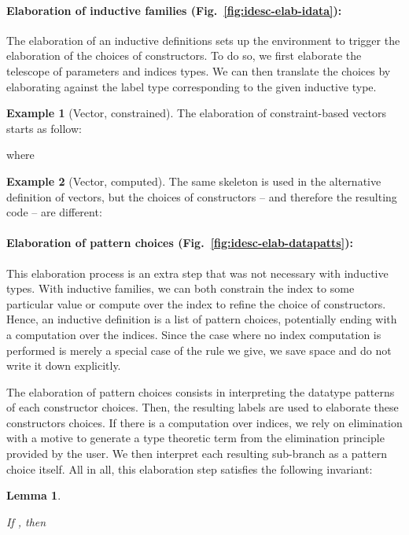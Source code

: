 \documentclass{scrartcl}
\theoremstyle{plain}
\newtheorem{lemma}{Lemma}
\theoremstyle{definition}
\newtheorem{example}{Example}
\begin{document}
\newcommand{\choicesVecEq}{\mathrm{choices}_{=}}
\newcommand{\codeVecEq}{\mathrm{code}_{=}}

\paragraph{Elaboration of inductive families (Fig.~\ref{fig:idesc-elab-idata}):} 
The elaboration of an inductive definitions sets up the environment to
trigger the elaboration of the choices of constructors. To do so, we
first elaborate the telescope of parameters and indices types. We can
then translate the choices by elaborating against the label type
corresponding to the given inductive type.

\begin{example}[Vector, constrained]
The elaboration of constraint-based vectors starts as follow:

where


\end{example}

\newcommand{\choicesVecComp}{\mathrm{choices}_{\to}}
\newcommand{\codeVecComp}{\mathrm{code}_{\to}}

\begin{example}[Vector, computed]

The same skeleton is used in the alternative definition of vectors,
but the choices of constructors -- and therefore the resulting code --
are different:
{\small

}

\end{example}



\paragraph{Elaboration of pattern choices (Fig.~\ref{fig:idesc-elab-datapatts}):}
This elaboration process is an extra step that was not necessary with
inductive types. With inductive families, we can both constrain the
index to some particular value or compute over the index to refine the
choice of constructors. Hence, an inductive definition is a list of
pattern choices, potentially ending with a computation over the
indices. Since the case where no index computation is performed is
merely a special case of the rule we give, we save space and do not
write it down explicitly.

The elaboration of pattern choices consists in interpreting the
datatype patterns of each constructor choices. Then, the resulting
labels are used to elaborate these constructors choices. If there is a
computation over indices, we rely on elimination with a motive
\citep{mcbride:elim-2,mcbride:elim} to generate a type theoretic term
from the elimination principle provided by the user. We then interpret
each resulting sub-branch as a pattern choice itself. All in all, this
elaboration step satisfies the following invariant:
\begin{lemma}\label{lemma:idesc-elab-datapatts}

If 
, then


\end{lemma}
\end{document}
